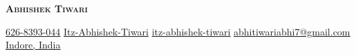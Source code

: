 \documentclass[letterpaper,11pt]{article}
\begin{document}

\begin{flushright}
  \color{gray}
\end{flushright}

\vspace{0pt}

\begin{center}
  \textbf{\Huge \scshape Abhishek Tiwari} \\[5pt]
\end{center}

\begin{center}
  \small
  \href{tel:626-8393-044}{\underline{626-8393-044}} \quad
  \href{https://github.com/Itz-Abhishek-Tiwari}{\underline{Itz-Abhishek-Tiwari}} \quad
  \href{https://www.linkedin.com/in/itz-abhishek-tiwari/}{\underline{itz-abhishek-tiwari}} \quad
  \href{mailto:abhitiwariabhi7@gmail.com}{\underline{abhitiwariabhi7@gmail.com}} \quad
  \href{https://g.co/kgs/AgNBcui}{\underline{Indore, India}}
\end{center}
\vspace{5pt}





    


\end{document}
